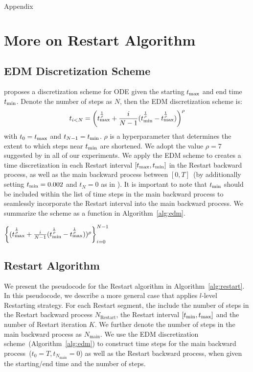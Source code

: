 {\huge Appendix}



\section{More on Restart Algorithm}
\subsection{EDM Discretization Scheme}
\label{app:edm-time}
\cite{Karras2022ElucidatingTD} proposes a discretization scheme for ODE given the starting $t_{\textrm{max}}$ and end time $t_{\textrm{min}}$. Denote the number of steps as $N$, then the EDM discretization scheme is:
\begin{align*}
    t_{i<N} = \left(t_{\textrm{max}}^{\frac{1}{\rho}} + \frac{i}{N-1}(t_{\textrm{min}}^{\frac{1}{\rho}}- t_{\textrm{max}}^{\frac{1}{\rho}})\right)^\rho
\end{align*}
with $t_0 = t_{\textrm{max}}$ and $t_{N-1}=t_{\textrm{min}}$. $\rho$ is a hyperparameter that determines the extent to which steps near $t_{\textrm{min}}$ are shortened. We adopt the value $\rho=7$ suggested by \cite{Karras2022ElucidatingTD} in all of our experiments. We apply the EDM scheme to creates a time discretization in each Restart interval $[t_{\textrm{max}}, t_{\textrm{min}}]$ in the Restart backward process, as well as the main backward process between $[0,T]$~(by additionally setting $t_{\textrm{min}}=0.002$ and $t_N=0$ as in \cite{Karras2022ElucidatingTD}). It is important to note that $t_{\textrm{min}}$ should be included within the list of time steps in the main backward process to seamlessly incorporate the Restart interval into the main backward process. We summarize the scheme as a function in Algorithm~\ref{alg:edm}.

\begin{algorithm}[htb]
  \caption{{EDM\_Scheme($\tmin, \tmax, N, \rho=7)$}}
  \label{alg:edm}
\begin{algorithmic}[1]
  \Return $\left\{(t_{\textrm{max}}^{\frac{1}{\rho}} + \frac{i}{N-1}(t_{\textrm{min}}^{\frac{1}{\rho}}- t_{\textrm{max}}^{\frac{1}{\rho}}))^\rho\right\}_{i=0}^{N-1}$
\end{algorithmic}
\end{algorithm}



\subsection{Restart Algorithm}
\label{app:restart-alg}

We present the pseudocode for the Restart algorithm in Algorithm~\ref{alg:restart}. In this pseudocode, we describe a more general case that applies $l$-level Restarting strategy. For each Restart segment, the include the number of steps in the Restart backward process $N_{\textrm{Restart}}$, the Restart interval $[t_{\textrm{min}}, t_{\textrm{max}}]$ and the number of Restart iteration $K$. We further denote the number of steps in the main backward process as $N_{\textrm{main}}$. We use the EDM discretization scheme~(Algorithm~\ref{alg:edm}) to construct time steps for the main backward process~($t_0=T, t_{N_{\textrm{main}}}=0$) as well as the Restart backward process, when given the starting/end time and the number of steps.

